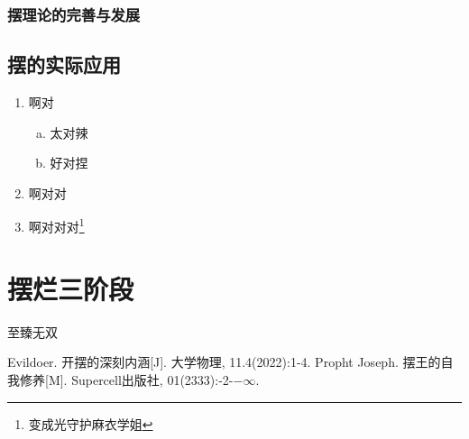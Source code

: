 \documentclass[12pt,a4paper]{article}%
\begin{document}
	\subsubsection{摆理论的完善与发展}
	\subsection{摆的实际应用}
	\begin{enumerate}[1.]%
		\item 啊对
		\begin{enumerate}[(a)]%
			\item 太对辣
			\item 好对捏
		\end{enumerate}
		\item 啊对对
		\item 啊对对对\footnote{变成光守护麻衣学姐}%
	\end{enumerate}
	
	\section{摆烂三阶段}
	至臻无双
	
	
	
	
	
	\newpage
	\begin{thebibliography}{99}%
		Evildoer. 开摆的深刻内涵[J]. 大学物理, 11.4(2022):1-4.
		Propht Joseph. 摆王的自我修养[M]. Supercell出版社, 01(2333):-2-$-\infty$.
	\end{thebibliography}
	
	
\end{document}

